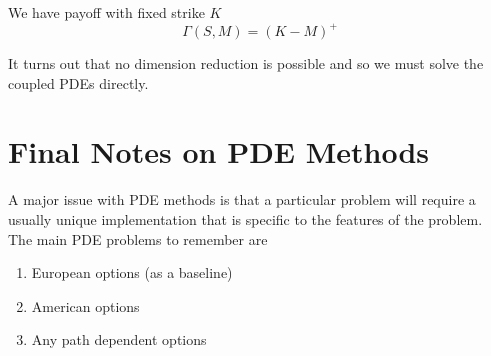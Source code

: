 \documentclass[12pt]{article}
\newlength\tindent
\renewcommand{\indent}{\hspace*{\tindent}}
\begin{document}
We have payoff with fixed strike $K$ 
\begin{equation*}
	\Gamma(S, M) = (K - M)^+
\end{equation*}

\indent It turns out that no dimension reduction is possible and so we must solve the coupled PDEs directly. 

\section{Final Notes on PDE Methods}

\indent A major issue with PDE methods is that a particular problem will require a usually unique implementation that is specific to the features of the problem. \\

The main PDE problems to remember are
\begin{enumerate}
	\item European options (as a baseline) 
	\item American options
	\item Any path dependent options
\end{enumerate}
\end{document}
